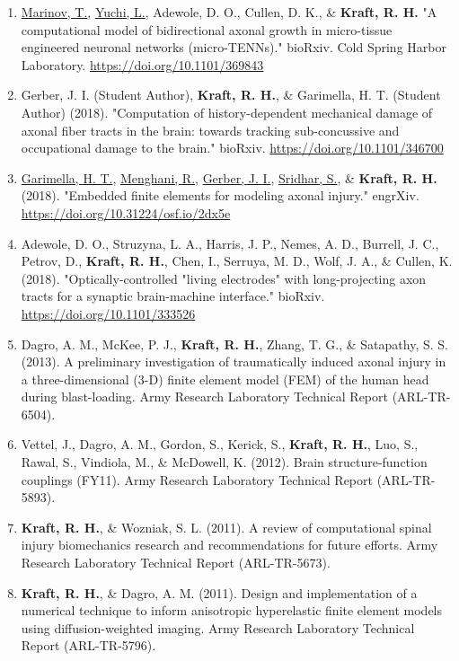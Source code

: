 \documentclass[a4paper,10pt]{article}
\begin{document}
\begin{enumerate}
\def\labelenumi{\arabic{enumi}.}
  \item \underline{Marinov, T.}, \underline{Yuchi, L.}, Adewole, D. O., Cullen, D. K., \&
 \textbf{\textbf{Kraft,} R. H.} "A computational model of bidirectional axonal growth in micro-tissue engineered neuronal networks (micro-TENNs)." bioRxiv. Cold Spring Harbor Laboratory. \url{https://doi.org/10.1101/369843}
  \item Gerber, J. I. (Student Author), \textbf{\textbf{Kraft,} R. H.}, \&
 Garimella, H. T. (Student Author) (2018). "Computation of history-dependent mechanical damage of axonal fiber tracts in the brain: towards tracking sub-concussive and occupational damage to the brain." bioRxiv. \url{https://doi.org/10.1101/346700}
  \item \underline{Garimella, H. T.}, \underline{Menghani, R.}, \underline{Gerber, J. I.}, \underline{Sridhar, S.}, \&
 \textbf{\textbf{Kraft,} R. H.} (2018). "Embedded finite elements for modeling axonal injury." engrXiv. \url{https://doi.org/10.31224/osf.io/2dx5e}
  \item Adewole, D. O., Struzyna, L. A., Harris, J. P., Nemes, A. D., Burrell, J. C., Petrov, D., \textbf{\textbf{Kraft,} R. H.}, Chen, I., Serruya, M. D., Wolf, J. A., \&
 Cullen, K. (2018). "Optically-controlled "living electrodes" with long-projecting axon tracts for a synaptic brain-machine interface." bioRxiv. \url{https://doi.org/10.1101/333526}
  \item Dagro, A. M., McKee, P. J., \textbf{\textbf{Kraft,} R. H.}, Zhang, T. G., \&
 Satapathy, S. S. (2013). A preliminary investigation of traumatically induced axonal injury in a three-dimensional (3-D) finite element model (FEM) of the human head during blast-loading. Army Research Laboratory Technical Report (ARL-TR-6504).
  \item Vettel, J., Dagro, A. M., Gordon, S., Kerick, S., \textbf{\textbf{Kraft,} R. H.}, Luo, S., Rawal, S., Vindiola, M., \&
 McDowell, K. (2012). Brain structure-function couplings (FY11). Army Research Laboratory Technical Report (ARL-TR-5893).
  \item \textbf{\textbf{Kraft,} R. H.}, \&
 Wozniak, S. L. (2011). A review of computational spinal injury biomechanics research and recommendations for future efforts. Army Research Laboratory Technical Report (ARL-TR-5673).
  \item \textbf{\textbf{Kraft,} R. H.}, \&
 Dagro, A. M. (2011). Design and implementation of a numerical technique to inform anisotropic hyperelastic finite element models using diffusion-weighted imaging. Army Research Laboratory Technical Report (ARL-TR-5796).

\end{enumerate}
\end{document}
